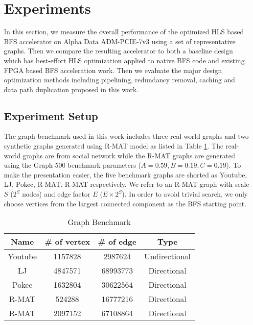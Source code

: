 \section{Experiments} \label{sec:experiment}
In this section, we measure the overall performance of the optimized 
HLS based BFS accelerator on Alpha Data ADM-PCIE-7v3 using a set of 
representative graphs. Then we compare the resulting accelerator to 
both a baseline design which has best-effort HLS optimization applied to 
native BFS code and existing FPGA based BFS acceleration work. Then we evaluate 
the major design optimization methods including pipelining, redundancy removal,  
caching and data path duplication proposed in this work. 

\subsection{Experiment Setup}
The graph benchmark used in this work includes three real-world graphs and 
two synthetic graphs generated using R-MAT model \cite{chakrabarti2004rmat} 
as listed in Table \ref{tab:graph}. The real-world graphs are from social network \cite{yang2012defining, 
leskovec2009community, takac2012data} while the R-MAT graphs are generated 
using the Graph 500 benchmark parameters ($A=0.59, B=0.19, C=0.19$). To make the 
presentation easier, the five benchmark graphs are shorted as Youtube, 
LJ, Pokec, R-MAT\uppercase\expandafter{}, 
R-MAT\uppercase\expandafter{} respectively. We refer 
to an R-MAT graph with scale $S$ ($2^{S}$ nodes) and edge factor $E$ ($E\times 2^{S}$). 
In order to avoid trivial search, we only choose vertices from the largest 
connected component as the BFS starting point.

\begin{table}
    \centering
  \caption{Graph Benchmark}
  \label{tab:graph}
  \begin{tabular}{cccc}
    \toprule
      Name & \# of vertex & \# of edge & Type \\
    \midrule
      Youtube \cite{yang2012defining} & 1157828 & 2987624 & Undirectional \\
      LJ \cite{leskovec2009community} & 4847571 & 68993773 & Directional \\
      Pokec \cite{takac2012data} & 1632804 & 30622564 & Directional \\
      R-MAT\uppercase\expandafter{\romannumeral1} & 524288 & 16777216 & Directional \\
      R-MAT\uppercase\expandafter{\romannumeral2} & 2097152 & 67108864 & Directional \\
  \bottomrule
\end{tabular}
\end{table}

